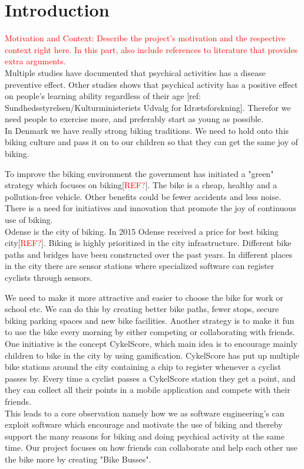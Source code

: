 \section{Introduction}
\textcolor{red}{Motivation and Context: Describe the project’s motivation and the respective context right here. In this part, also include references to literature that provides extra arguments.}\\


Multiple studies have documented that psychical activities has a disease preventive effect. Other studies shows that psychical activity has a positive effect on people's learning ability regardless of their age [ref: Sundhedsstyrelsen/Kulturministeriets Udvalg for Idrætsforskning]. Therefor we need people to exercise more, and preferably start as young as possible. \\


In Denmark we have really strong biking traditions. We need to hold onto this biking culture and pass it on to our children so that they can get the same joy of biking. 


To improve the biking environment the government has initiated a "green" strategy which focuses on biking[\textcolor{red}{REF?}]. The bike is a cheap, healthy and a pollution-free vehicle. Other benefits could be fewer accidents and less noise. There is a need for initiatives and innovation that promote the joy of continuous use of biking. \\


Odense is the city of biking. In 2015 Odense received a price for best biking city[\textcolor{red}{REF?}]. Biking is highly prioritized in the city infrastructure. Different bike paths and bridges have been constructed over the past years. In different places in the city there are sensor stations where specialized software can register cyclists through sensors. 


We need to make it more attractive and easier to choose the bike for work or school etc. We can do this by creating better bike paths, fewer stops, secure biking parking spaces and new bike facilities. Another strategy is to make it fun to use the bike every morning by either competing or collaborating with friends. \\


One initiative is the concept CykelScore, which main idea is to encourage mainly children to bike in the city by using gamification. CykelScore has put up multiple bike stations around the city containing a chip to register whenever a cyclist passes by. Every time a cyclist passes a CykelScore station they get a point, and they can collect all their points in a mobile application and compete with their friends. \\


This leads to a core observation namely how we as software engineering's can exploit software which encourage and motivate the use of biking and thereby support the many reasons for biking and doing psychical activity at the same time. 
Our project focuses on how friends can collaborate and help each other use the bike more by creating "Bike Busses".